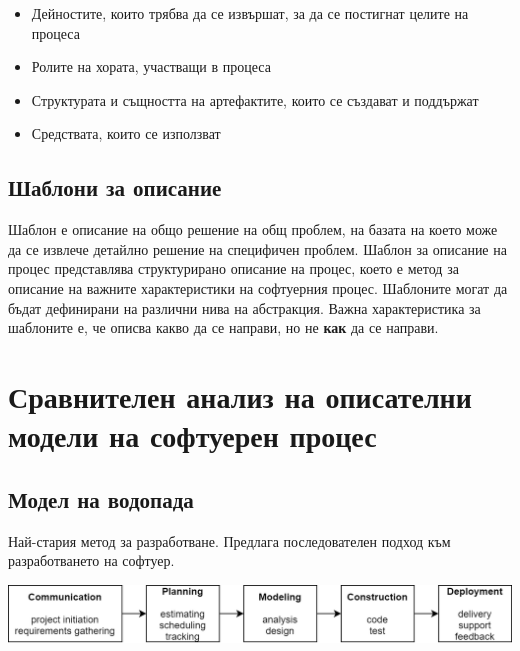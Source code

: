 \documentclass[fleqn,12pt]{article}
\begin{document}
\begin{itemize}
	\item Дейностите, които трябва да се извършат, за да се постигнат целите на процеса
	\item Ролите на хората, участващи в процеса
	\item Структурата и същността на артефактите, които се създават и поддържат
	\item Средствата, които се използват
\end{itemize}

\subsection{Шаблони за описание}
Шаблон е описание на общо решение на общ проблем, на базата на което може да се извлече детайлно решение на специфичен проблем.
Шаблон за описание на процес представлява структурирано описание на процес, което е метод за описание на важните характеристики на софтуерния процес. Шаблоните могат да бъдат дефинирани на различни нива на абстракция. Важна характеристика за шаблоните е, че описва какво да се направи, но не \textbf{как} да се направи.

\section{Сравнителен анализ на описателни модели на софтуерен процес}
\subsection{Модел на водопада}
Най-стария метод за разработване. Предлага последователен подход към разработването на софтуер.

\leavevmode \newline
\includegraphics[width=\textwidth]{waterfall}
\leavevmode \newline
\end{document}
